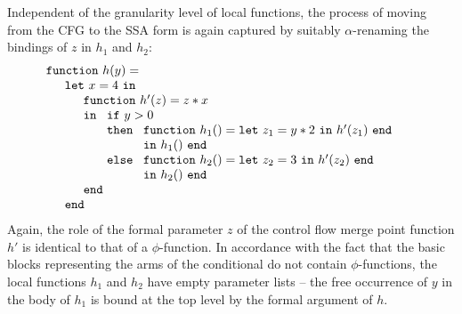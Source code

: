 Independent of the granularity level of local functions, the process
of moving from the CFG to the SSA form is again captured by suitably
$\alpha$-renaming the bindings of $z$ in $h_1$ and $h_2$:
\begin{equation}
\label{DirectStyleCode3}
\begin{array}{l}
\texttt{function}\ h (y) =\\
\quad
  \begin{array}{l}
    \texttt{let}\ x=4\ \texttt{in} \\
    \quad \begin{array}{l}
            \texttt{function}\ h' (z) = z*x \\
            \texttt{in}\
                \begin{array}[t]{l}
                  \texttt{if}\ y>0\\
                  \texttt{then}\ 
                     \begin{array}[t]{l}
                        \texttt{function}\ h_1 () = \texttt{let}\
                              z_1 = y*2\ \texttt{in}\ h'(z_1)\ \texttt{end}\\
                        \texttt{in}\ h_1()\ \texttt{end}
                     \end{array}\\
                  \texttt{else}\ 
                     \begin{array}[t]{l}
                        \texttt{function}\ h_2 () = \texttt{let}\
                              z_2 = 3\ \texttt{in}\ h'(z_2)\ \texttt{end}\\
                        \texttt{in}\ h_2()\ \texttt{end}
                     \end{array}
                \end{array}\\
            \texttt{end}
          \end{array} \\
    \texttt{end}
  \end{array}
\end{array}
\end{equation}
Again, the role of the formal parameter $z$ of the control flow merge
point function $h'$ is identical to that of a $\phi$-function. In
accordance with the fact that the basic blocks representing the arms
of the conditional do not contain $\phi$-functions, the local
functions $h_1$ and $h_2$ have empty parameter lists -- the free
occurrence of $y$ in the body of $h_1$ is bound at the top level by
the formal argument of $h$.

